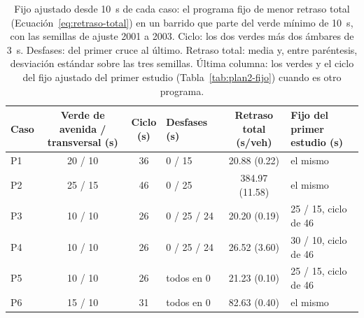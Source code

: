 \begin{table}[H]
\centering
\footnotesize
\setlength{\tabcolsep}{4pt}
\begin{tabular}{lcclcl}
\toprule
Caso & \makecell{Verde de avenida /\\transversal (s)} & \makecell{Ciclo\\(s)} & Desfases (s) & \makecell{Retraso total\\(s/veh)} & \makecell[l]{Fijo del primer\\estudio (s)} \\
\midrule
P1 & 20 / 10 & 36 & 0 / 15      & 20.88 (0.22)   & el mismo \\
P2 & 25 / 15 & 46 & 0 / 25      & 384.97 (11.58) & el mismo \\
P3 & 10 / 10 & 26 & 0 / 25 / 24 & 20.20 (0.19)   & 25 / 15, ciclo de 46 \\
P4 & 10 / 10 & 26 & 0 / 25 / 24 & 26.52 (3.60)   & 30 / 10, ciclo de 46 \\
P5 & 10 / 10 & 26 & todos en 0  & 21.23 (0.10)   & 25 / 15, ciclo de 46 \\
P6 & 15 / 10 & 31 & todos en 0  & 82.63 (0.40)   & el mismo \\
\bottomrule
\end{tabular}
\caption[Medición más estricta: fijo ajustado desde 10~s por caso]{Fijo ajustado desde 10~s de cada caso: el programa fijo de menor retraso total (Ecuación~\ref{eq:retraso-total}) en un barrido que parte del verde mínimo de 10~s, con las semillas de ajuste 2001 a 2003. Ciclo: los dos verdes más dos ámbares de 3~s. Desfases: del primer cruce al último. Retraso total: media y, entre paréntesis, desviación estándar sobre las tres semillas. Última columna: los verdes y el ciclo del fijo ajustado del primer estudio (Tabla~\ref{tab:plan2-fijo}) cuando es otro programa.}
\label{tab:robustez-fijo}
\end{table}

